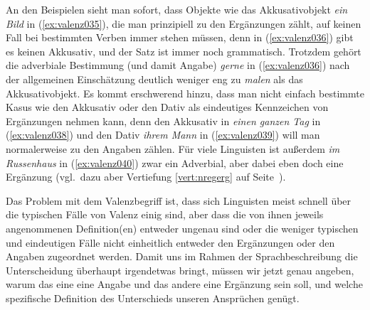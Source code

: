 \begin{exe}
  \ex\label{ex:valenz034}
  \begin{xlist}
  \end{xlist}
\end{exe}

An den Beispielen sieht man sofort, dass Objekte wie das Akkusativobjekt \textit{ein Bild} in (\ref{ex:valenz035}), die man prinzipiell zu den Ergänzungen zählt, auf keinen Fall bei bestimmten Verben immer stehen müssen, denn in (\ref{ex:valenz036}) gibt es keinen Akkusativ, und der Satz ist immer noch grammatisch.
Trotzdem gehört die adverbiale Bestimmung (und damit Angabe) \textit{gerne} in (\ref{ex:valenz036}) nach der allgemeinen Einschätzung deutlich weniger eng zu \textit{malen} als das Akkusativobjekt.
Es kommt erschwerend hinzu, dass man nicht einfach bestimmte Kasus wie den Akkusativ oder den Dativ als eindeutiges Kennzeichen von Ergänzungen nehmen kann, denn den Akkusativ in \textit{einen ganzen Tag} in (\ref{ex:valenz038}) und den Dativ \textit{ihrem Mann} in (\ref{ex:valenz039}) will man normalerweise zu den Angaben zählen.
Für viele Linguisten ist außerdem \textit{im Russenhaus} in (\ref{ex:valenz040}) zwar ein Adverbial, aber dabei eben doch eine Ergänzung (vgl.\ dazu aber Vertiefung \ref{vert:nregerg} auf Seite~\pageref{vert:nregerg}).

\begin{exe}
  \ex\label{ex:valenz037}
  \begin{xlist}
  \end{xlist}
\end{exe}

Das Problem mit dem Valenzbegriff ist, dass sich Linguisten meist schnell über die typischen Fälle von Valenz einig sind, aber dass die von ihnen jeweils angenommenen Definition(en) entweder ungenau sind oder die weniger typischen und eindeutigen Fälle nicht einheitlich entweder den Ergänzungen oder den Angaben zugeordnet werden.
Damit uns im Rahmen der Sprachbeschreibung die Unterscheidung überhaupt irgendetwas bringt, müssen wir jetzt genau angeben, warum das eine eine Angabe und das andere eine Ergänzung sein soll, und welche spezifische Definition des Unterschieds unseren Ansprüchen genügt.

